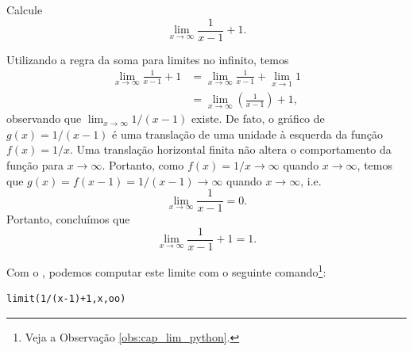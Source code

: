 \begin{exeresol}
  Calcule
  \begin{equation}
    \lim_{x\to \infty} \frac{1}{x-1}+1.
  \end{equation}
\end{exeresol}
\begin{resol}
  Utilizando a regra da soma para limites no infinito, temos
  \begin{align}
    \lim_{x\to\infty} \frac{1}{x-1} + 1 &= \lim_{x\to \infty} \frac{1}{x-1} + \lim_{x\to 1} 1\\
                                        &= \lim_{x\to \infty} \left(\frac{1}{x-1}\right)+1,
  \end{align}
  observando que $\lim_{x\to \infty}1/(x-1)$ existe. De fato, o gráfico de $g(x) = 1/(x-1)$ é uma translação de uma unidade à esquerda da função $f(x)=1/x$. Uma translação horizontal finita não altera o comportamento da função para $x\to \infty$. Portanto, como $f(x)=1/x\to\infty$ quando $x\to\infty$, temos que $g(x)=f(x-1)=1/(x-1)\to\infty$ quando $x\to\infty$, i.e.
  \begin{equation}
    \lim_{x\to\infty}\frac{1}{x-1} = 0.
  \end{equation}
  Portanto, concluímos que
  \begin{equation}
    \lim_{x\to \infty} \frac{1}{x-1} + 1 = 1. 
  \end{equation}

  \ifispython
  Com o \sympy, podemos computar este limite com o seguinte comando\footnote{Veja a Observação \ref{obs:cap_lim_python}.}:
\begin{verbatim}
limit(1/(x-1)+1,x,oo)
\end{verbatim}
  \fi
\end{resol}

